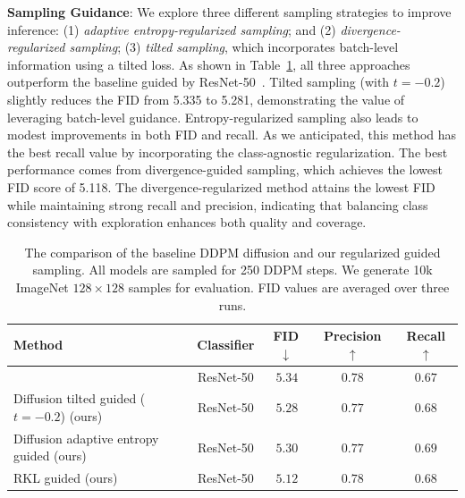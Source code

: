 \documentclass{article}
\begin{document}
\textbf{Sampling Guidance}: We explore three different sampling strategies to improve inference:  (1) \textit{adaptive entropy-regularized sampling}; and (2) \textit{divergence-regularized sampling}; (3) \textit{tilted sampling}, which incorporates batch-level information using a tilted loss. As shown in Table~\ref{tab:fid10koff}, all three approaches outperform the baseline guided by ResNet-50~\cite{ma2023elucidating}. Tilted sampling (with $t = -0.2$) slightly reduces the FID from 5.335 to 5.281, demonstrating the value of leveraging batch-level guidance. Entropy-regularized sampling also leads to modest improvements in both FID and recall. As we anticipated, this method has the best recall value by incorporating the class-agnostic regularization. The best performance comes from divergence-guided sampling, which achieves the lowest FID score of 5.118. The divergence-regularized method attains the lowest FID while maintaining strong recall and precision, indicating that balancing class consistency with exploration enhances both quality and coverage.
\begin{table}[h]
\vspace{-1em}
  \centering
  \caption{The comparison of the baseline DDPM diffusion and our regularized guided sampling. All models are sampled for 250 DDPM steps. We generate 10k ImageNet $128\times128$ samples for evaluation. FID values are averaged over three runs.}
\vspace{5pt}
  \label{tab:fid10koff}
  \begin{tabular}{lcccc}
    \toprule
    \textbf{Method} & \textbf{Classifier} &\textbf{FID} $\downarrow$ & \textbf{Precision} $\uparrow$ & \textbf{Recall} $\uparrow$ \\
    \midrule
    \cite{ma2023elucidating} & ResNet-50 &  $\,5.34 $ & $\mathbf{0.78} $ & $0.67 $ \\
    Diffusion tilted guided ($t=-0.2$) (ours) & ResNet-50  &  $\,5.28 $ & $0.77 $ & $0.68 $ \\
    Diffusion adaptive entropy guided (ours) & ResNet-50  &  $\,5.30 $ & $0.77 $ & $\mathbf{0.69} $ \\
    RKL guided (ours) & ResNet-50  &  $\,\mathbf{5.12}$ & $\mathbf{0.78} $ & $0.68 $ \\
    \bottomrule
  \end{tabular}
\end{table}
\end{document}
